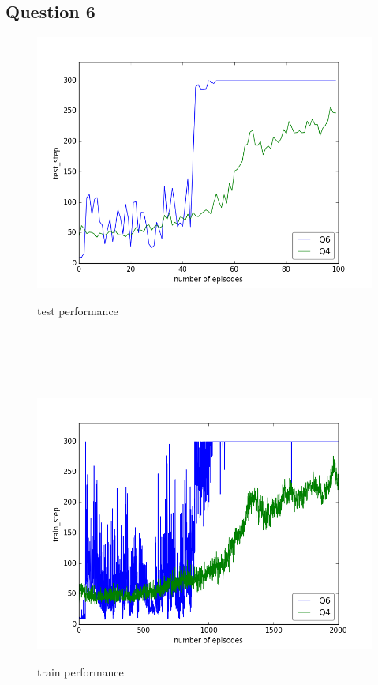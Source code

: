 \documentclass{report}
\begin{document}
\subsection*{Question 6}

\begin{figure}[H]
\begin{minipage}[c]{.49\linewidth}
	\centering
	\includegraphics[width = \linewidth]{plots/a6/test_step.png}
	\caption{test performance}
    \end{minipage}
    \hfill%
\begin{minipage}[c]{.49\linewidth}
    \centering 
    \includegraphics[width = \linewidth]{plots/a6/train_step.png}
	\caption{train performance}
\end{minipage}

\end{figure}
\end{document}
